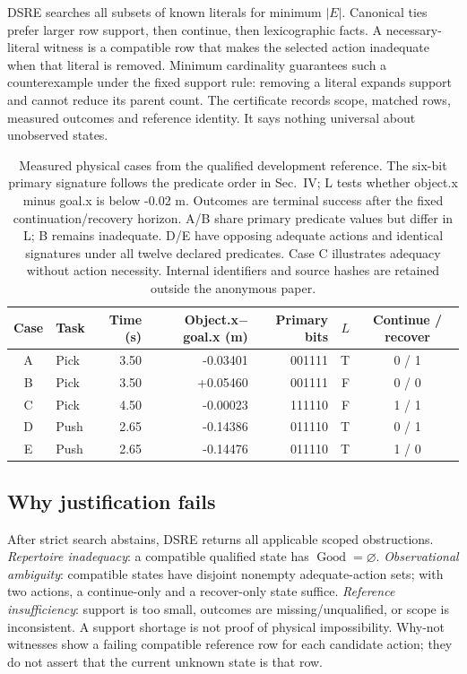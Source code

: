 \documentclass[conference]{IEEEtran}
\newcommand{\Good}{\operatorname{Good}}
\begin{document}
DSRE searches all subsets of known literals for minimum $|E|$. Canonical ties prefer larger row support, then continue, then lexicographic facts. A necessary-literal witness is a compatible row that makes the selected action inadequate when that literal is removed. Minimum cardinality guarantees such a counterexample under the fixed support rule: removing a literal expands support and cannot reduce its parent count. The certificate records scope, matched rows, measured outcomes and reference identity. It says nothing universal about unobserved states.

\begin{table}[t]
\caption{Measured physical cases from the qualified development reference. The six-bit primary signature follows the predicate order in Sec.~IV; L tests whether object.x minus goal.x is below -0.02 m. Outcomes are terminal success after the fixed continuation/recovery horizon. A/B share primary predicate values but differ in L; B remains inadequate. D/E have opposing adequate actions and identical signatures under all twelve declared predicates. Case C illustrates adequacy without action necessity. Internal identifiers and source hashes are retained outside the anonymous paper.}
\label{tab:physical}\centering
\begin{tabular}{clrrrrc}\toprule
Case & Task & Time (s) & Object.x$-$goal.x (m) & Primary bits & $L$ & Continue / recover\\\midrule
A & Pick & 3.50 & -0.03401 & 001111 & T & 0 / 1\\
B & Pick & 3.50 & +0.05460 & 001111 & F & 0 / 0\\
C & Pick & 4.50 & -0.00023 & 111110 & F & 1 / 1\\
D & Push & 2.65 & -0.14386 & 011110 & T & 0 / 1\\
E & Push & 2.65 & -0.14476 & 011110 & T & 1 / 0\\
\bottomrule\end{tabular}
\end{table}

\subsection{Why justification fails}
After strict search abstains, DSRE returns all applicable scoped obstructions. \emph{Repertoire inadequacy}: a compatible qualified state has $\Good=\varnothing$. \emph{Observational ambiguity}: compatible states have disjoint nonempty adequate-action sets; with two actions, a continue-only and a recover-only state suffice. \emph{Reference insufficiency}: support is too small, outcomes are missing/unqualified, or scope is inconsistent. A support shortage is not proof of physical impossibility. Why-not witnesses show a failing compatible reference row for each candidate action; they do not assert that the current unknown state is that row.
\end{document}
